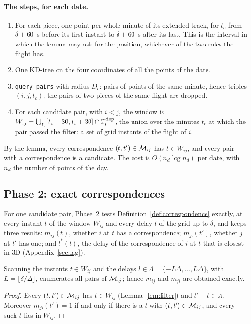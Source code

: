 \paragraph{The steps, for each date.}
\begin{enumerate}
  \item For each piece, one point per whole minute of its extended track, for $t_c$ from
        $\delta+60$~s before its first instant to $\delta+60$~s after its last. This is the
        interval in which the lemma may ask for the position, whichever of the two roles the
        flight has.
  \item One KD-tree on the four coordinates of all the points of the date.
  \item \texttt{query\_pairs} with radius $D_c$: pairs of points of the same minute, hence
        triples $(i,j,t_c)$; the pairs of two pieces of the same flight are dropped.
  \item For each candidate pair, with $i<j$, the window is
        $W_{ij}=\bigcup_{t_c}[t_c-30,t_c+30]\cap T^{\mathrm{dep}}_i$, the union over the minutes $t_c$ at which
        the pair passed the filter: a set of grid instants of the flight of $i$.
\end{enumerate}
By the lemma, every correspondence $(t,t')\in\mathcal{M}_{ij}$ has $t\in W_{ij}$, and every pair with a
correspondence is a candidate. The cost is $O(n_d\log n_d)$ per date, with $n_d$ the number of
points of the day.

\subsection{Phase 2: exact correspondences}\label{sec:phase2}

For one candidate pair, Phase~2 tests Definition~\ref{def:correspondence} exactly, at every
instant $t$ of the window $W_{ij}$ and every delay $l$ of the grid up to $\delta$, and keeps three
results: $m_{ij}(t)$, whether $i$ at $t$ has a correspondence; $m_{ji}(t')$, whether $j$ at $t'$
has one; and $l^*(t)$, the delay of the correspondence of $i$ at $t$ that is closest in 3D
(Appendix~\ref{sec:lag}).

\begin{lemma}\label{lem:scan}
Scanning the instants $t\in W_{ij}$ and the delays $l\in\Lambda=\{-L\Delta,\dots,L\Delta\}$, with
$L=\lfloor\delta/\Delta\rfloor$, enumerates all pairs of $\mathcal{M}_{ij}$; hence $m_{ij}$ and $m_{ji}$ are
obtained exactly.
\end{lemma}

\begin{proof}
Every $(t,t')\in\mathcal{M}_{ij}$ has $t\in W_{ij}$ (Lemma~\ref{lem:filter}) and $t'-t\in\Lambda$. Moreover
$m_{ji}(t')=1$ if and only if there is a $t$ with $(t,t')\in\mathcal{M}_{ij}$, and every such $t$ lies in
$W_{ij}$.
\end{proof}

